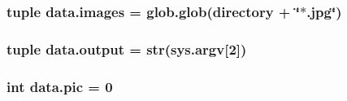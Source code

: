 \subsubsection[{images}]{\setlength{\rightskip}{0pt plus 5cm}tuple data.\+images = glob.\+glob({\bf directory} + \char`\"{}$\ast$.jpg\char`\"{})}\label{namespacedata_afad7d0c44155fd378ffa57d79db01581}
\hypertarget{namespacedata_a7db2d5f10640a9611ccd6ed7d7d441bf}{}
\subsubsection[{output}]{\setlength{\rightskip}{0pt plus 5cm}tuple data.\+output = str(sys.\+argv\mbox{[}2\mbox{]})}\label{namespacedata_a7db2d5f10640a9611ccd6ed7d7d441bf}
\hypertarget{namespacedata_ab8681af0efc43b633fc4015ff584af4e}{}
\subsubsection[{pic}]{\setlength{\rightskip}{0pt plus 5cm}int data.\+pic = 0}\label{namespacedata_ab8681af0efc43b633fc4015ff584af4e}
